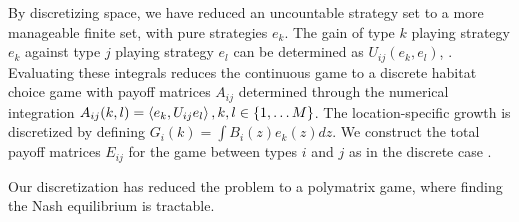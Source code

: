 By discretizing space, we have reduced an uncountable strategy set to a more manageable finite set, with pure strategies $e_k$. The gain of type $k$ playing strategy $e_k$ against type $j$ playing strategy $e_l$ can be determined as $U_{ij}(e_k,e_l)$, . Evaluating these integrals reduces the continuous game to a discrete habitat choice game  with payoff matrices $A_{ij}$ determined through the numerical integration $A_{ij}(k,l)=\left \langle e_k,U_{ij}e_l \right \rangle, k,l \in \{1,\dots M\}$. The location-specific growth is discretized by defining $G_i(k) = \int B_i(z) e_k(z) dz$. We construct the total payoff matrices $E_{ij}$ for the game between types $i$ and $j$ as in the discrete case .

Our discretization has reduced the problem to a polymatrix game, where finding the Nash equilibrium is tractable.

